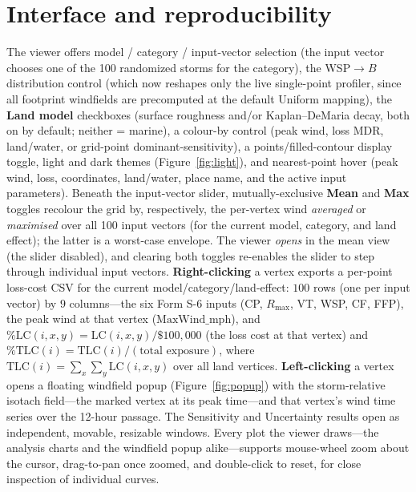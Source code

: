 \documentclass[11pt]{article}
\begin{document}
\section{Interface and reproducibility}
The viewer offers model / category / input-vector selection (the input vector
chooses one of the 100 randomized storms for the category), the WSP$\to B$
distribution control (which now reshapes only the live single-point profiler,
since all footprint windfields are precomputed at the default Uniform mapping),
the \textbf{Land model} checkboxes
(surface roughness and/or Kaplan--DeMaria decay, both on by default; neither =
marine), a colour-by control
(peak wind, loss MDR, land/water, or grid-point dominant-sensitivity), a
points/filled-contour display toggle,
light and dark themes (Figure~\ref{fig:light}), and nearest-point hover (peak
wind, loss, coordinates, land/water, place name, and the active input
parameters). Beneath the input-vector slider, mutually-exclusive \textbf{Mean} and
\textbf{Max} toggles recolour the grid by, respectively, the per-vertex wind
\emph{averaged} or \emph{maximised} over all 100 input vectors (for the current
model, category, and land effect); the latter is a worst-case envelope. The viewer
\emph{opens} in the mean view (the slider disabled), and clearing both toggles
re-enables the slider to step through individual input vectors. \textbf{Right-clicking}
a vertex exports a per-point loss-cost CSV for the current model/category/land-effect:
$100$ rows (one per input vector) by $9$ columns---the six Form S-6 inputs (CP,
$R_{\max}$, VT, WSP, CF, FFP), the peak wind at that vertex ($\mathrm{MaxWind\_mph}$),
and $\%\mathrm{LC}(i,x,y)=\mathrm{LC}(i,x,y)/\$100{,}000$
(the loss cost at that vertex) and $\%\mathrm{TLC}(i)=\mathrm{TLC}(i)/(\text{total
exposure})$, where $\mathrm{TLC}(i)=\sum_x\sum_y \mathrm{LC}(i,x,y)$ over all land
vertices. \textbf{Left-clicking} a vertex opens a floating windfield popup
(Figure~\ref{fig:popup}) with the storm-relative isotach field---the marked
vertex at its peak time---and that vertex's wind time series over the 12-hour
passage. The Sensitivity and Uncertainty results open as independent, movable,
resizable windows. Every plot the viewer draws---the analysis charts and the
windfield popup alike---supports mouse-wheel zoom about the cursor, drag-to-pan
once zoomed, and double-click to reset, for close inspection of individual curves.
\end{document}
